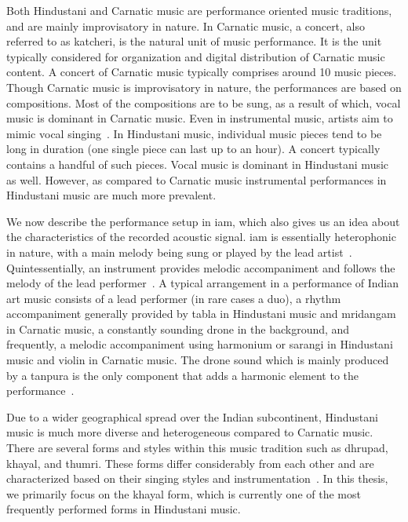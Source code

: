 Both Hindustani and Carnatic music are performance oriented music traditions, and are mainly improvisatory in nature. In Carnatic music, a concert, also referred to as \gls{katcheri}, is the natural unit of music performance. It is the unit typically considered for organization and digital distribution of Carnatic music content. A concert of Carnatic music typically comprises around 10 music pieces. Though Carnatic music is improvisatory in nature, the performances are based on compositions. Most of the compositions are to be sung, as a result of which, vocal music is dominant in Carnatic music. Even in instrumental music, artists aim to mimic vocal singing~\citep{Viswanathan2004}. In Hindustani music, individual music pieces tend to be long in duration (one single piece can last up to an hour). A concert typically contains a handful of such pieces. Vocal music is dominant in Hindustani music as well. However, as compared to Carnatic music instrumental performances in Hindustani music are much more prevalent. 

We now describe the performance setup in \gls{iam}, which also gives us an idea about the characteristics of the recorded acoustic signal. \gls{iam} is essentially heterophonic in nature, with a main melody being sung or played by the lead artist~\citep{Bagchee1998}. Quintessentially, an instrument provides melodic accompaniment and follows the melody of the lead performer~\citep{Viswanathan2004}. A typical arrangement in a performance of Indian art music consists of a lead performer (in rare cases a duo), a rhythm accompaniment generally provided by \gls{tabla} in Hindustani music and \gls{mridangam} in Carnatic music, a constantly sounding drone in the background, and frequently, a melodic accompaniment using harmonium or \gls{sarangi} in Hindustani music and violin in Carnatic music. The drone sound which is mainly produced by a \gls{tanpura} is the only component that adds a harmonic element to the performance~\citep{Bagchee1998}. %

Due to a wider geographical spread over the Indian subcontinent, Hindustani music is much more diverse and heterogeneous compared to Carnatic music. There are several forms and styles within this music tradition such as \gls{dhrupad}, \gls{khayal}, and \gls{thumri}. These forms differ considerably from each other and are characterized based on their singing styles and instrumentation~\citep{Bor2010}. In this thesis, we primarily focus on the \gls{khayal} form, which is currently one of the most frequently performed forms in Hindustani music. 

